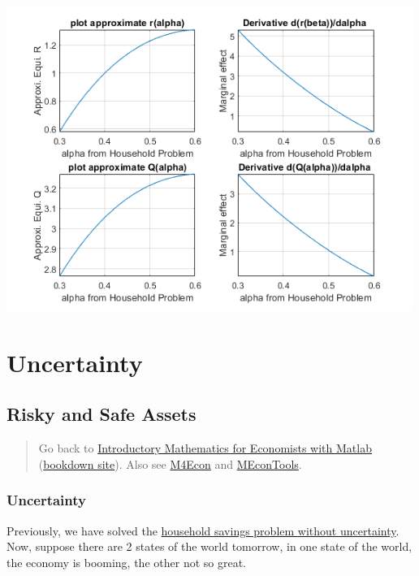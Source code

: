 \documentclass[
]{book}
\begin{document}
\includegraphics[width=5.20833in,height=\textheight]{img/demand_supply_taylor_approximate_capital_images/figure_4.png}

\hypertarget{uncertainty}{%
\chapter{Uncertainty}\label{uncertainty}}

\hypertarget{risky-and-safe-assets}{%
\section{Risky and Safe Assets}\label{risky-and-safe-assets}}

\begin{quote}
Go back to \href{https://math4econ.github.io/}{Introductory Mathematics for Economists with Matlab} (\href{https://math4econ.github.io/bookdown}{bookdown site}). Also see \href{http://fanwangecon.github.io/M4Econ}{M4Econ} and \href{https://fanwangecon.github.io/MEconTools/}{MEconTools}.
\end{quote}

\hypertarget{uncertainty-1}{%
\subsection{\texorpdfstring{\textbf{Uncertainty}}{Uncertainty}}\label{uncertainty-1}}

Previously, we have solved the \href{https://math4econ.github.io/derivative_application/K_save_households.html}{household savings problem without
uncertainty}.
Now, suppose there are 2 states of the world tomorrow, in one state of
the world, the economy is booming, the other not so great.
\end{document}
